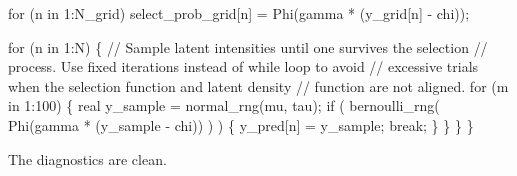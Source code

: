 \documentclass[
  letterpaper,
  DIV=11,
  numbers=noendperiod]{scrartcl}
\newenvironment{Shaded}{\begin{snugshade}}{\end{snugshade}}
\newcommand{\AttributeTok}[1]{\textcolor[rgb]{0.40,0.45,0.13}{#1}}
\newcommand{\CommentTok}[1]{\textcolor[rgb]{0.37,0.37,0.37}{#1}}
\newcommand{\ControlFlowTok}[1]{\textcolor[rgb]{0.00,0.23,0.31}{#1}}
\newcommand{\DataTypeTok}[1]{\textcolor[rgb]{0.68,0.00,0.00}{#1}}
\newcommand{\DecValTok}[1]{\textcolor[rgb]{0.68,0.00,0.00}{#1}}
\newcommand{\FunctionTok}[1]{\textcolor[rgb]{0.28,0.35,0.67}{#1}}
\newcommand{\NormalTok}[1]{\textcolor[rgb]{0.00,0.23,0.31}{#1}}
\newcommand{\OtherTok}[1]{\textcolor[rgb]{0.00,0.23,0.31}{#1}}
\newcommand{\SpecialCharTok}[1]{\textcolor[rgb]{0.37,0.37,0.37}{#1}}
\newcommand{\StringTok}[1]{\textcolor[rgb]{0.13,0.47,0.30}{#1}}
\begin{document}
\begin{codelisting}
\begin{Shaded}
\begin{Highlighting}[]
  \ControlFlowTok{for}\NormalTok{ (n }\ControlFlowTok{in} \DecValTok{1}\NormalTok{:N\_grid)}
\NormalTok{    select\_prob\_grid[n] = Phi(gamma * (y\_grid[n] {-} chi));}

  \ControlFlowTok{for}\NormalTok{ (n }\ControlFlowTok{in} \DecValTok{1}\NormalTok{:N) \{}
    \CommentTok{// Sample latent intensities until one survives the selection}
    \CommentTok{// process.  Use fixed iterations instead of while loop to avoid }
    \CommentTok{// excessive trials when the selection function and latent density }
    \CommentTok{// function are not aligned.}
    \ControlFlowTok{for}\NormalTok{ (m }\ControlFlowTok{in} \DecValTok{1}\NormalTok{:}\DecValTok{100}\NormalTok{) \{}
      \DataTypeTok{real}\NormalTok{ y\_sample = normal\_rng(mu, tau);}
      \ControlFlowTok{if}\NormalTok{ ( bernoulli\_rng( Phi(gamma * (y\_sample {-} chi)) ) ) \{}
\NormalTok{        y\_pred[n] = y\_sample;}
        \ControlFlowTok{break}\NormalTok{;}
\NormalTok{      \}}
\NormalTok{    \}}
\NormalTok{  \}}
\NormalTok{\}}
\end{Highlighting}
\end{Shaded}

\end{codelisting}

\begin{Shaded}
\end{Shaded}

The diagnostics are clean.

\begin{Shaded}
\end{Shaded}
\end{document}
